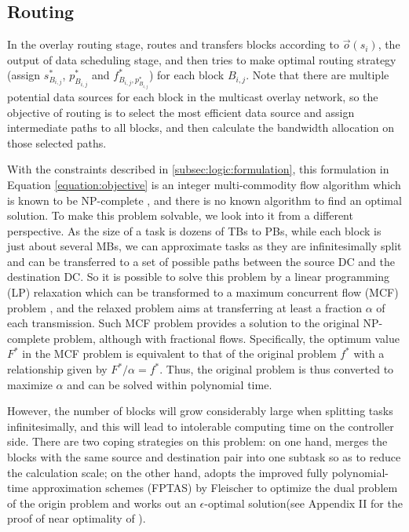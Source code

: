 \subsection{Routing}
\label{subsec:logic:routing}

In the overlay routing stage, \name routes and transfers blocks according to $\overrightarrow{o}(s_i)$, the output of data scheduling stage, and then tries to make optimal routing strategy (assign $s_{B_{i,j}}^*$, $p_{B_{i,j}}^*$ and $f^*_{B_{i,j},p_{B_{i,j}}^*}$) for each block $B_{i,j}$. Note that there are multiple potential data sources for each block in the multicast overlay network, so the objective of routing is to select the most efficient data source and assign intermediate paths to all blocks, and then calculate the bandwidth allocation on those selected paths.

With the constraints described in \Section\ref{subsec:logic:formulation}, this formulation in Equation \ref{equation:objective} is an integer multi-commodity flow algorithm which is known to be NP-complete \cite{garg1997primal}, and there is no known algorithm to find an optimal solution. To make this problem solvable, we look into it from a different perspective. As the size of a task is dozens of TBs to PBs, while each block is just about several MBs, we can approximate tasks as they are infinitesimally split and can be transferred to a set of possible paths between the source DC and the destination DC. So it is possible to solve this problem by a linear programming (LP) relaxation which can be transformed to a maximum concurrent flow (MCF) problem \cite{garg2007faster,reed2012traffic}, and the relaxed problem aims at transferring at least a fraction $\alpha$ of each transmission. Such MCF problem provides a solution to the original NP-complete problem, although with fractional flows. Specifically, the optimum value $F^*$ in the MCF problem is equivalent to that of the original problem $f^*$ with a relationship given by $F^* / \alpha = f^*$. Thus, the original problem is thus converted to maximize $\alpha$ and can be solved within polynomial time.

However, the number of blocks will grow considerably large when splitting tasks infinitesimally, and this will lead to intolerable computing time on the controller side. There are two coping strategies on this problem: on one hand, \name merges the blocks with the same source and destination pair into one subtask so as to reduce the calculation scale; on the other hand, \name adopts the improved fully polynomial-time approximation schemes (FPTAS) by Fleischer \cite{fleischer2000approximating} to optimize the dual problem of the origin problem and works out an $\epsilon$-optimal solution(see Appendix II for the proof of near optimality of \name).%
